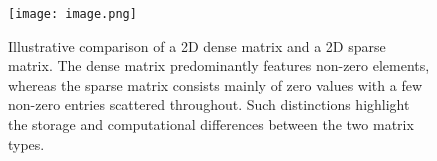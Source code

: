 \begin{figure}[h]
    \centering
    \texttt{[image: image.png]}
    \caption{Illustrative comparison of a 2D dense matrix and a 2D sparse matrix. The dense matrix predominantly features non-zero elements, whereas the sparse matrix consists mainly of zero values with a few non-zero entries scattered throughout. Such distinctions highlight the storage and computational differences between the two matrix types.}
    \label{fig:dense_sparse_matrix}
\end{figure}